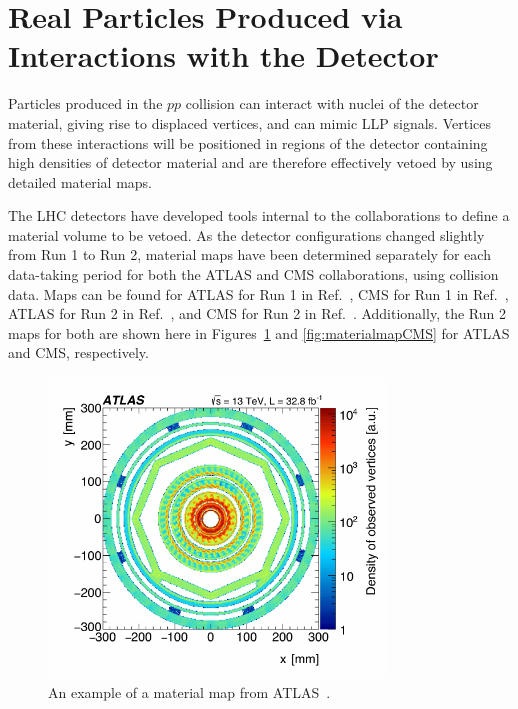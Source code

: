 \section{Real Particles Produced via Interactions with the Detector} %

Particles produced in the $pp$ collision can interact with nuclei of the detector material, giving rise to displaced vertices, and can mimic LLP signals. Vertices from these interactions will be positioned in regions of the detector containing high densities of detector material and are therefore effectively vetoed by using detailed material maps.

The LHC detectors have developed tools internal to the collaborations to define a material volume to be vetoed. As the detector configurations changed slightly from Run 1 to Run 2, material maps have been determined separately for each data-taking period for both the ATLAS and CMS collaborations, using collision data. Maps can be found for ATLAS for Run 1 in Ref.~\cite{Aaboud:2016poq}, CMS for Run 1 in Ref.~\cite{CMS:2010nua}, ATLAS for Run 2 in Ref.~\cite{Aaboud:2017iio}, and CMS for Run 2 in Ref.~\cite{Sirunyan:2018icq}. Additionally, the Run 2 maps for both are shown here in Figures~\ref{fig:materialmapATLAS} and \ref{fig:materialmapCMS} for ATLAS and CMS, respectively.
%
\begin{figure}[t]
  \centering
  \includegraphics[width=0.8\textwidth]{figures/atlasmaterial.pdf}
  \caption{An example of a material map from ATLAS~\cite{Aaboud:2017iio}.
  }
  \label{fig:materialmapATLAS}
\end{figure}

